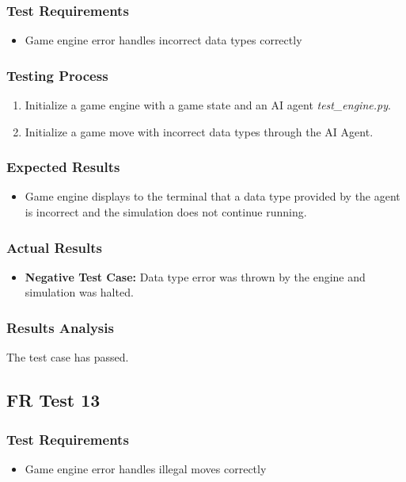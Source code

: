 \documentclass[12pt, titlepage]{article}
\begin{document}
\subsubsection{Test Requirements}
\begin{itemize}
    \item Game engine error handles incorrect data types correctly
\end{itemize}
\subsubsection{Testing Process}
\begin{enumerate}
    \item Initialize a game engine with a game state and an AI agent \textit{test\_engine.py}. 
    \item Initialize a game move with incorrect data types through the AI Agent.
\end{enumerate}
\subsubsection{Expected Results}
\begin{itemize}
    \item Game engine displays to the terminal that a data type provided by the agent is incorrect and the simulation does not continue running.
\end{itemize}
\subsubsection{Actual Results}
\begin{itemize}
    \item \textbf{Negative Test Case:} Data type error was thrown by the engine and simulation was halted.
\end{itemize}
\subsubsection{Results Analysis}
The test case has passed.

\subsection{FR Test 13}
\subsubsection{Test Requirements}
\begin{itemize}
    \item Game engine error handles illegal moves correctly
\end{itemize}
\end{document}
